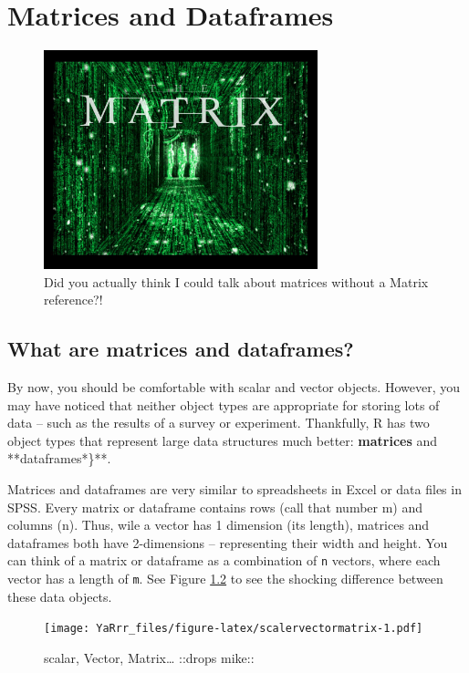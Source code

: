 \documentclass[]{book}
\theoremstyle{definition}
\theoremstyle{definition}
\theoremstyle{remark}
\begin{document}
\chapter{Matrices and Dataframes}\label{matricesdataframes}

\begin{figure}

{\centering \includegraphics[width=300px]{images/matrix} 

}

\caption{Did you actually think I could talk about matrices without a Matrix reference?!}\label{fig:unnamed-chunk-168}
\end{figure}

\section{What are matrices and
dataframes?}\label{what-are-matrices-and-dataframes}

By now, you should be comfortable with scalar and vector objects.
However, you may have noticed that neither object types are appropriate
for storing lots of data -- such as the results of a survey or
experiment. Thankfully, R has two object types that represent large data
structures much better: \textbf{matrices} and **dataframes*\}**.

Matrices and dataframes are very similar to spreadsheets in Excel or
data files in SPSS. Every matrix or dataframe contains rows (call that
number m) and columns (n). Thus, wile a vector has 1 dimension (its
length), matrices and dataframes both have 2-dimensions -- representing
their width and height. You can think of a matrix or dataframe as a
combination of \texttt{n} vectors, where each vector has a length of
\texttt{m}. See Figure \ref{fig:scalervectormatrix} to see the shocking
difference between these data objects.

\begin{figure}[htbp]
\centering
\texttt{[image: YaRrr\_files/figure-latex/scalervectormatrix-1.pdf]}
\caption{\label{fig:scalervectormatrix}scalar, Vector, Matrix\ldots{}
::drops mike::}
\end{figure}
\end{document}
